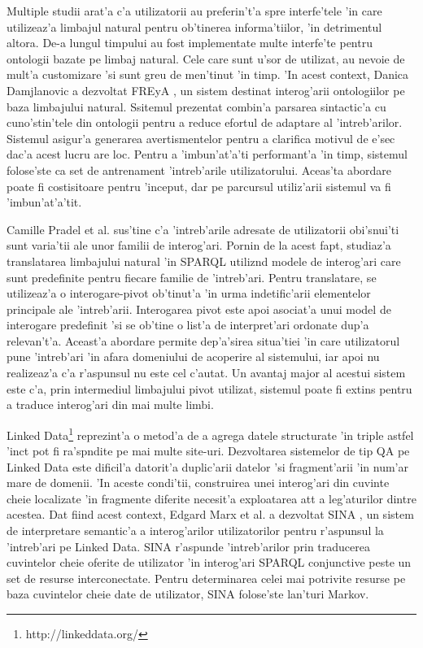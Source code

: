 \documentclass[12pt,a4paper,twoside]{report}
\begin{document}
Multiple studii arat'a c'a utilizatorii au preferin't'a spre interfe'tele 'in care utilizeaz'a limbajul natural pentru ob'tinerea informa'tiilor, 'in detrimentul altora. De-a lungul timpului au fost implementate multe interfe'te pentru ontologii bazate pe limbaj natural. Cele care sunt u'sor de utilizat, au nevoie de mult'a customizare 'si sunt greu de men'tinut 'in timp. 'In acest context, Danica Damjlanovic a dezvoltat FREyA \cite{DamljanovicNaturalInteraction}, un sistem destinat interog'arii ontologiilor pe baza limbajului natural. Ssitemul prezentat combin'a parsarea sintactic'a cu cuno'stin'tele din ontologii pentru a reduce efortul de adaptare al 'intreb'arilor. Sistemul asigur'a generarea avertismentelor pentru a clarifica motivul de e'sec dac'a acest lucru are loc. Pentru a 'imbun'at'a'ti performant'a 'in timp, sistemul folose'ste ca set de antrenament 'intreb'arile utilizatorului. Aceas'ta abordare poate fi costisitoare pentru 'inceput, dar pe parcursul utiliz'arii sistemul va fi 'imbun'at'a'tit. 

Camille Pradel et al. \cite{PradelNaturalPatterns} sus'tine c'a 'intreb'arile adresate de utilizatorii obi'snui'ti sunt varia'tii ale unor familii de interog'ari. Pornin de la acest fapt, studiaz'a translatarea limbajului natural 'in SPARQL utiliz\ia nd modele de interog'ari care sunt predefinite pentru fiecare familie de 'intreb'ari. Pentru translatare, se utilizeaz'a o interogare-pivot ob'tinut'a 'in urma indetific'arii elementelor principale ale 'intreb'arii. Interogarea pivot este apoi asociat'a unui model de interogare predefinit 'si se ob'tine o list'a de interpret'ari ordonate dup'a relevan't'a. Aceast'a abordare permite dep'a'sirea situa'tiei 'in care utilizatorul pune 'intreb'ari 'in afara domeniului de acoperire al sistemului, iar apoi nu realizeaz'a c'a r'aspunsul nu este cel c'autat. Un avantaj major al acestui sistem este c'a, prin intermediul limbajului pivot utilizat, sistemul poate fi extins pentru a traduce interog'ari din mai multe limbi.



Linked Data\footnote{http://linkeddata.org/}  reprezint'a o metod'a de a agrega datele structurate 'in triple astfel 'inc\ia t pot fi ra'sp\ia ndite pe mai multe site-uri. Dezvoltarea sistemelor de tip QA pe Linked Data este dificil'a datorit'a duplic'arii datelor 'si fragment'arii 'in num'ar mare de  domenii. 'In aceste condi'tii, construirea unei interog'ari din cuvinte cheie localizate 'in fragmente diferite necesit'a exploatarea at\ia t a leg'aturilor dintre acestea. Dat fiind acest context, Edgard Marx et al. a dezvoltat SINA \cite{sina}, un sistem de interpretare semantic'a a interog'arilor utilizatorilor pentru r'aspunsul la 'intreb'ari pe Linked Data.  SINA r'aspunde 'intreb'arilor prin traducerea cuvintelor cheie oferite de utilizator 'in interog'ari SPARQL conjunctive peste un set de resurse interconectate. Pentru determinarea celei mai potrivite resurse pe baza cuvintelor cheie date de utilizator, SINA folose'ste lan'turi Markov. 
\end{document}
